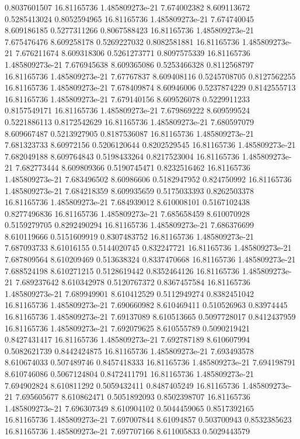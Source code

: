 {0.8037601507 16.81165736 1.485809273e-21 7.674002382 8.609113672 0.5285413024
0.8052594965 16.81165736 1.485809273e-21 7.674740045 8.609186185 0.5277311266
0.8067588423 16.81165736 1.485809273e-21 7.675476476 8.609258178 0.5269227032
0.8082581881 16.81165736 1.485809273e-21 7.676211674 8.609318306 0.5261273771
0.8097575339 16.81165736 1.485809273e-21 7.676945638 8.609365086 0.5253466328
0.8112568797 16.81165736 1.485809273e-21 7.67767837 8.609408116 0.5245708705
0.8127562255 16.81165736 1.485809273e-21 7.678409874 8.60946006 0.5237874229
0.8142555713 16.81165736 1.485809273e-21 7.679140156 8.609526078 0.5229911233
0.8157549171 16.81165736 1.485809273e-21 7.679869222 8.609599524 0.5221886113
0.8172542629 16.81165736 1.485809273e-21 7.680597079 8.609667487 0.5213927905
0.8187536087 16.81165736 1.485809273e-21 7.681323733 8.60972156 0.5206120644
0.8202529545 16.81165736 1.485809273e-21 7.682049188 8.609764843 0.5198433264
0.8217523004 16.81165736 1.485809273e-21 7.682773444 8.609809366 0.5190745471
0.8232516462 16.81165736 1.485809273e-21 7.683496502 8.60986606 0.5182947952
0.824750992 16.81165736 1.485809273e-21 7.684218359 8.609935659 0.5175033393
0.8262503378 16.81165736 1.485809273e-21 7.684939012 8.610008101 0.5167102438
0.8277496836 16.81165736 1.485809273e-21 7.685658459 8.610070928 0.5159279705
0.8292490294 16.81165736 1.485809273e-21 7.686376699 8.610119666 0.5151609919
0.8307483752 16.81165736 1.485809273e-21 7.687093733 8.61016155 0.5144020745
0.832247721 16.81165736 1.485809273e-21 7.687809564 8.610209469 0.513638324
0.8337470668 16.81165736 1.485809273e-21 7.688524198 8.610271215 0.5128619442
0.8352464126 16.81165736 1.485809273e-21 7.689237642 8.610342978 0.5120767372
0.8367457584 16.81165736 1.485809273e-21 7.689949901 8.610412529 0.5112949274
0.8382451042 16.81165736 1.485809273e-21 7.690660982 8.610469411 0.510526963
0.83974445 16.81165736 1.485809273e-21 7.69137089 8.610513665 0.5097728017
0.8412437959 16.81165736 1.485809273e-21 7.692079625 8.610555789 0.5090219421
0.8427431417 16.81165736 1.485809273e-21 7.692787189 8.610607994 0.5082621739
0.8442424875 16.81165736 1.485809273e-21 7.693493578 8.610674033 0.507489746
0.8457418333 16.81165736 1.485809273e-21 7.694198791 8.610746086 0.5067124804
0.8472411791 16.81165736 1.485809273e-21 7.694902824 8.610811292 0.5059432411
0.8487405249 16.81165736 1.485809273e-21 7.695605677 8.610862471 0.5051892093
0.8502398707 16.81165736 1.485809273e-21 7.696307349 8.610904102 0.5044459065
0.8517392165 16.81165736 1.485809273e-21 7.697007844 8.61094857 0.503700943
0.8532385623 16.81165736 1.485809273e-21 7.697707166 8.611005833 0.5029443579
}
